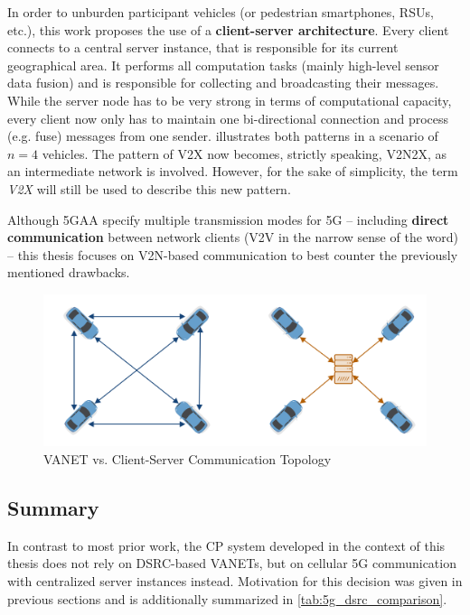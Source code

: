 In order to unburden participant vehicles (or pedestrian smartphones, RSUs, etc.), this work proposes the use of a \textbf{client-server architecture}. Every client connects to a central server instance, that is responsible for its current geographical area. It performs all computation tasks (mainly high-level sensor data fusion) and is responsible for collecting and broadcasting their messages. While the server node has to be very strong in terms of computational capacity, every client now only has to maintain one bi-directional connection and process (e.g. fuse) messages from one sender.  illustrates both patterns in a scenario of $n = 4$ vehicles. The pattern of V2X now becomes, strictly speaking, V2N2X, as an intermediate network is involved. However, for the sake of simplicity, the term \textit{V2X} will still be used to describe this new pattern. 

Although 5GAA specify multiple transmission modes for 5G \cite{5GAutomotiveAssociation2016} – including \textbf{direct communication} between network clients (V2V in the narrow sense of the word) – this thesis focuses on V2N-based communication to best counter the previously mentioned drawbacks. 

\begin{figure}[h]
	\centering
	\includegraphics[width=0.9\linewidth]{98_images/topology_comparison}
	\caption{VANET vs. Client-Server Communication Topology}
	\label{fig:communication_topology}
\end{figure}


\subsection{Summary}
\label{subsec:concept_design:5g:summary}
In contrast to most prior work, the CP system developed in the context of this thesis does not rely on DSRC-based VANETs, but on cellular 5G communication with centralized server instances instead. Motivation for this decision was given in previous sections and is additionally summarized in \cref{tab:5g_dsrc_comparison}.

